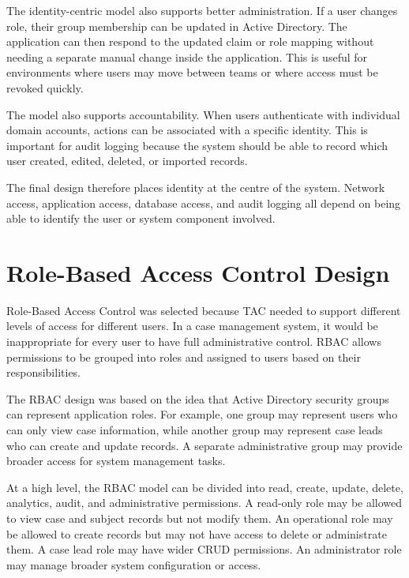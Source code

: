 The identity-centric model also supports better administration. If a user changes role, their group membership can be updated in Active Directory. The application can then respond to the updated claim or role mapping without needing a separate manual change inside the application. This is useful for environments where users may move between teams or where access must be revoked quickly.

The model also supports accountability. When users authenticate with individual domain accounts, actions can be associated with a specific identity. This is important for audit logging because the system should be able to record which user created, edited, deleted, or imported records.

The final design therefore places identity at the centre of the system. Network access, application access, database access, and audit logging all depend on being able to identify the user or system component involved.


\section{Role-Based Access Control Design}

Role-Based Access Control was selected because TAC needed to support different levels of access for different users. In a case management system, it would be inappropriate for every user to have full administrative control. RBAC allows permissions to be grouped into roles and assigned to users based on their responsibilities.

The RBAC design was based on the idea that Active Directory security groups can represent application roles. For example, one group may represent users who can only view case information, while another group may represent case leads who can create and update records. A separate administrative group may provide broader access for system management tasks.

At a high level, the RBAC model can be divided into read, create, update, delete, analytics, audit, and administrative permissions. A read-only role may be allowed to view case and subject records but not modify them. An operational role may be allowed to create records but may not have access to delete or administrate them. A case lead role may have wider CRUD permissions. An administrator role may manage broader system configuration or access.

